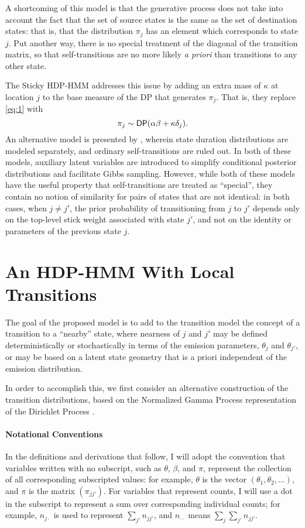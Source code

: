 A shortcoming of this model is that the generative process does not
take into account the fact that the set of source states is the same
as the set of destination states: that is, that the distribution
$\pi_j$ has an element which corresponds to state $j$.  Put another
way, there is no special treatment of the diagonal of the transition
matrix, so that self-transitions are no more likely {\it a priori}
than transitions to any other state.

The Sticky HDP-HMM \citep{fox2008hdp} addresses this issue by adding
an extra mass of $\kappa$ at location $j$ to the base measure of the
DP that generates $\pi_j$.  That is, they replace \eqref{eq:1} with
\begin{equation}
  \label{eq:6} \pi_j \sim \mathsf{DP}(\alpha\beta + \kappa \delta_j).
\end{equation} An alternative model is presented by
\cite{johnson2013bayesian}, wherein state duration distributions are
modeled separately, and ordinary self-transitions are ruled out.  In
both of these models, auxiliary latent variables are introduced to
simplify conditional posterior distributions and facilitate Gibbs
sampling.  However, while both of these models have the useful
property that self-transitions are treated as ``special'', they
contain no notion of similarity for pairs of states that are not
identical: in both cases, when $j \neq j'$, the prior probability of
transitioning from $j$ to $j'$ depends only on the top-level stick
weight associated with state $j'$, and not on the identity or
parameters of the previous state $j$.

\section{An HDP-HMM With Local Transitions}

The goal of the proposed model is to add to the transition model the
concept of a transition to a ``nearby'' state, where nearness of $j$
and $j'$ may be defined deterministically or stochastically in terms
of the emission parameters, $\theta_j$ and $\theta_{j'}$, or may be
based on a latent state geometry that is a priori independent of the
emission distribution.

In order to accomplish this, we first consider an alternative
construction of the transition distributions, based on the Normalized
Gamma Process representation of the Dirichlet Process
\citep{ferguson1973bayesian}.

\paragraph{Notational Conventions} In the definitions and derivations
that follow, I will adopt the convention that variables written with
no subscript, such as $\theta$, $\beta$, and $\pi$, represent the
collection of all corresponding subscripted values: for example,
$\theta$ is the vector $(\theta_1, \theta_2, \dots)$, and $\pi$ is the
matrix $(\pi_{jj'})$.  For variables that represent counts, I will use
a dot in the subscript to represent a sum over corresponding
individual counts; for example, $n_{j\cdot}$ is used to represent
$\sum_{j'} n_{jj'}$, and $n_{\cdot\cdot}$ means $\sum_{j}\sum_{j'}
n_{jj'}$.

